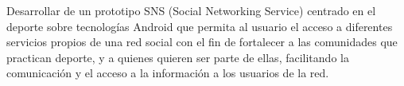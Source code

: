 Desarrollar de un prototipo SNS (Social Networking Service) centrado en el deporte sobre tecnologías Android que permita al usuario el acceso a diferentes servicios propios de una red social con el fin de fortalecer a las comunidades que practican deporte, y a quienes quieren ser parte de ellas, facilitando la comunicación y el acceso a la información a los usuarios de la red.
